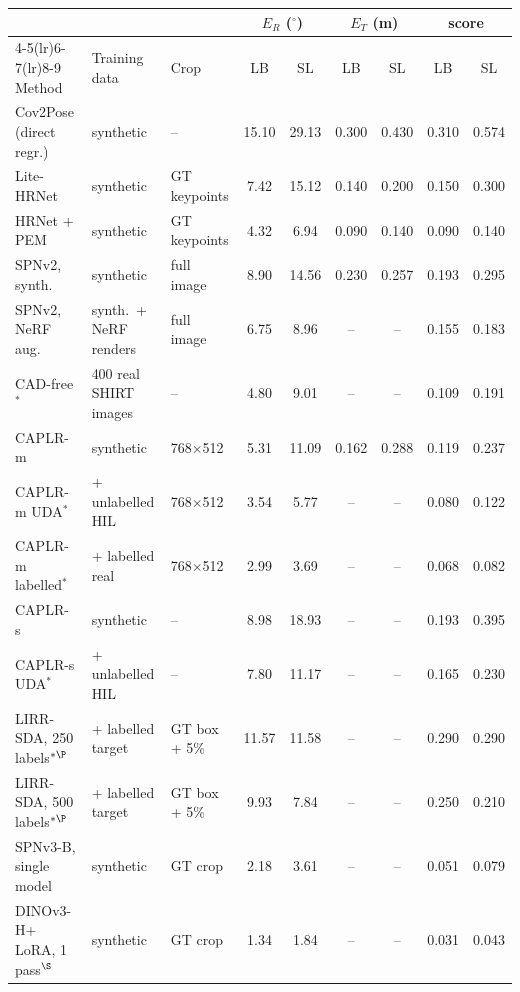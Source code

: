 \begin{tabular}{@{}l l l cc cc cc@{}}
\toprule
 & & & \multicolumn{2}{c}{$E_R$ ($^\circ$)} & \multicolumn{2}{c}{$E_T$ (m)} & \multicolumn{2}{c}{score} \\
\cmidrule(lr){4-5}\cmidrule(lr){6-7}\cmidrule(lr){8-9} Method & Training data & Crop & LB & SL & LB & SL & LB & SL \\
\midrule
Cov2Pose (direct regr.)~\cite{ousalah2026cov2pose} & synthetic & -- & 15.10 & 29.13 & 0.300 & 0.430 & 0.310 & 0.574 \\
Lite-HRNet~\cite{legrand2024domain} & synthetic & GT keypoints & 7.42 & 15.12 & 0.140 & 0.200 & 0.150 & 0.300 \\
HRNet + PEM~\cite{legrand2024domain} & synthetic & GT keypoints & 4.32 & 6.94 & 0.090 & 0.140 & 0.090 & 0.140 \\
SPNv2, synth.~\cite{legrand2026cadfree} & synthetic & full image & 8.90 & 14.56 & 0.230 & 0.257 & 0.193 & 0.295 \\
SPNv2, NeRF aug.~\cite{legrand2026cadfree} & synth.\ + NeRF renders & full image & 6.75 & 8.96 & -- & -- & 0.155 & 0.183 \\
CAD-free$^*$~\cite{legrand2026cadfree} & 400 real SHIRT images & -- & 4.80 & 9.01 & -- & -- & 0.109 & 0.191 \\
CAPLR-m~\cite{chenni2026caplr} & synthetic & 768$\times$512 & 5.31 & 11.09 & 0.162 & 0.288 & 0.119 & 0.237 \\
CAPLR-m UDA$^*$~\cite{chenni2026caplr} & + unlabelled HIL & 768$\times$512 & 3.54 & 5.77 & -- & -- & 0.080 & 0.122 \\
CAPLR-m labelled$^*$~\cite{chenni2026caplr} & + labelled real & 768$\times$512 & 2.99 & 3.69 & -- & -- & 0.068 & 0.082 \\
CAPLR-s~\cite{chenni2026caplr} & synthetic & -- & 8.98 & 18.93 & -- & -- & 0.193 & 0.395 \\
CAPLR-s UDA$^*$~\cite{chenni2026caplr} & + unlabelled HIL & -- & 7.80 & 11.17 & -- & -- & 0.165 & 0.230 \\
LIRR-SDA, 250 labels$^{*\P}$~\cite{singh2025lirr} & + labelled target & GT box + 5\% & 11.57 & 11.58 & -- & -- & 0.290 & 0.290 \\
LIRR-SDA, 500 labels$^{*\P}$~\cite{singh2025lirr} & + labelled target & GT box + 5\% & 9.93 & 7.84 & -- & -- & 0.250 & 0.210 \\
SPNv3-B, single model~\cite{park2026spnv3} & synthetic & GT crop & 2.18 & 3.61 & -- & -- & 0.051 & 0.079 \\
DINOv3-H+ LoRA, 1 pass$^\S$~\cite{church2026vfm} & synthetic & GT crop & 1.34 & 1.84 & -- & -- & 0.031 & 0.043 \\

\end{tabular}
